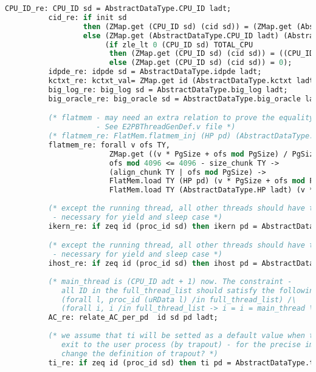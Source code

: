 \begin{lstlisting}[language=Caml]
          CPU_ID_re: CPU_ID sd = AbstractDataType.CPU_ID ladt;
          cid_re: if init sd
                  then (ZMap.get (CPU_ID sd) (cid sd)) = (ZMap.get (AbstractDataType.CPU_ID ladt) (AbstractDataType.cid ladt))
                  else (ZMap.get (AbstractDataType.CPU_ID ladt) (AbstractDataType.cid ladt)) = 0 /\
                       (if zle_lt 0 (CPU_ID sd) TOTAL_CPU
                        then (ZMap.get (CPU_ID sd) (cid sd)) = ((CPU_ID sd) + 1)
                        else (ZMap.get (CPU_ID sd) (cid sd)) = 0);
          idpde_re: idpde sd = AbstractDataType.idpde ladt;
          kctxt_re: kctxt_val= ZMap.get id (AbstractDataType.kctxt ladt);
          big_log_re: big_log sd = AbstractDataType.big_log ladt;
          big_oracle_re: big_oracle sd = AbstractDataType.big_oracle ladt;

          (* flatmem - may need an extra relation to prove the equality for load, store, and copy. 
                     - See E2PBThreadGenDef.v file *)
          (* flatmem_re: FlatMem.flatmem_inj (HP pd) (AbstractDataType.HP ladt); *)
          flatmem_re: forall v ofs TY,
                        ZMap.get ((v * PgSize + ofs mod PgSize) / PgSize) (pperm pd) = PGAlloc ->
                        ofs mod 4096 <= 4096 - size_chunk TY ->
                        (align_chunk TY | ofs mod PgSize) -> 
                        FlatMem.load TY (HP pd) (v * PgSize + ofs mod PgSize) =
                        FlatMem.load TY (AbstractDataType.HP ladt) (v * PgSize + ofs mod PgSize);
          
          (* except the running thread, all other threads should have the default value 
           - necessary for yield and sleep case *)
          ikern_re: if zeq id (proc_id sd) then ikern pd = AbstractDataType.ikern ladt else ikern pd = true;

          (* except the running thread, all other threads should have the default value 
           - necessary for yield and sleep case *)
          ihost_re: if zeq id (proc_id sd) then ihost pd = AbstractDataType.ihost ladt else ihost pd = true;
          
          (* main_thread is (CPU_ID adt + 1) now. The constraint - 
             all ID in the full_thread_list should satisfy the following constraint:
             (forall l, proc_id (uRData l) /in full_thread_list) /\ 
             (forall i, i /in full_thread_list -> i = i = main_thread \/ TOTAL_CPU < i < num_proc) *)
          AC_re: relate_AC_per_pd  id sd pd ladt;
           
          (* we assume that ti will be setted as a default value when the kernel 
             exit to the user process (by trapout) - for the precise implementation, we may need to 
             change the definition of trapout? *)
          ti_re: if zeq id (proc_id sd) then ti pd = AbstractDataType.ti ladt else  ti pd = init_trap_info;


\end{lstlisting}
